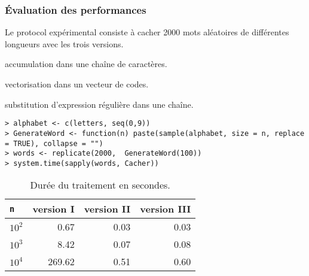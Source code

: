 \documentclass[10pt]{beamer}
\begin{document}
\begin{frame}[fragile]
  \frametitle{Évaluation des performances}
    Le protocol expérimental consiste à cacher 2000 mots aléatoires de différentes longueurs avec les trois versions.
  \begin{description}
  \item[Version I] accumulation dans une chaîne de caractères.
  \item[Version II] vectorisation dans un vecteur de codes.
  \item[Version III] substitution d'expression régulière dans une chaîne.
  \end{description}

  \begin{lstlisting}
> alphabet <- c(letters, seq(0,9))
> GenerateWord <- function(n) paste(sample(alphabet, size = n, replace = TRUE), collapse = "")
> words <- replicate(2000,  GenerateWord(100))
> system.time(sapply(words, Cacher))
  \end{lstlisting}

  \begin{table}[ht]
    \centering
    \begin{tabular}{l|rrr}
      \toprule
      \texttt{n} & version I & version II & version III \\
      \midrule
      $10^2$     &   0.67 & 0.03 & 0.03  \\
      $10^3$     &   8.42 & 0.07 & 0.08  \\
      $10^4$     & 269.62 & 0.51 & 0.60  \\
      \bottomrule
    \end{tabular}
    \caption{Durée du traitement en secondes.}
  \end{table}
\end{frame}



\questionSlide

 \appendix
 \backupSlides







\end{document}
